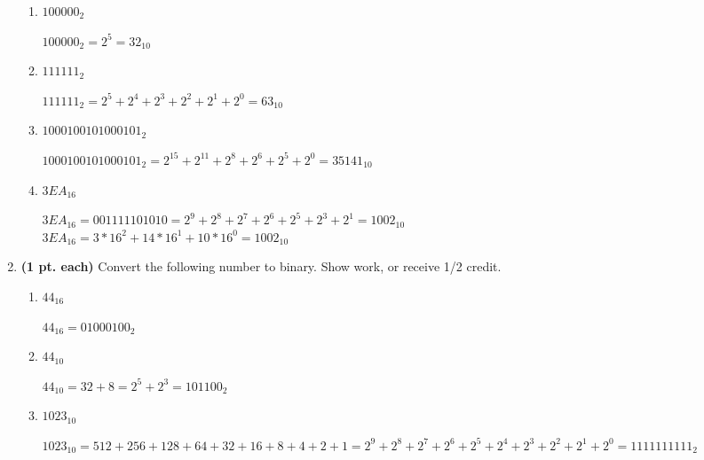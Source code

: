 \begin{enumerate}
\begin{enumerate}
            \item $100000_2$
                \begin{onlysolution}    \itshape $100000_2 = 2^5 = 32_{10}$
                \end{onlysolution}

            \item $111111_2$
                \begin{onlysolution}    \itshape $111111_2 = 2^5+2^4+2^3+2^2+2^1+2^0=63_{10}$
                \end{onlysolution}

            \item $1000100101000101_2$
                \begin{onlysolution}    \itshape $1000100101000101_2=2^{15}+2^{11}+2^8+2^6+2^5+2^0=35141_{10}$
                \end{onlysolution}

            \item $3EA_{16}$
                \begin{onlysolution}    \itshape$3EA_{16}=0011 1110 1010 =
                    2^9+2^8+2^7+2^6+2^5+2^3+2^1=1002_{10}$\\ {\color{blue} $3EA_{16} = 3*16^2 +14*16^1 + 10 *
                    16^0 = 1002_{10} $}
                \end{onlysolution}

        \end{enumerate}


    \item \textbf{ (1 pt. each)} Convert the following number to binary. Show
        work, or receive 1/2 credit.
        \begin{enumerate}
            \item $44_{16}$
                \begin{onlysolution}    \itshape $44_{16} =0100 0100_2$
                \end{onlysolution}

            \item $44_{10}$
                \begin{onlysolution}    \itshape $44_{10} = 32+8 = 2^5+2^3=101100_2$
                \end{onlysolution}

            \item $1023_{10}$
                \begin{onlysolution}    \itshape$1023_{10} = 512+256+128+64+32+16+8+4+2+1=
                    2^9+2^8+2^7+2^6+2^5+2^4+2^3+2^2+2^1+2^0=1111111111_2$
                \end{onlysolution}


\end{enumerate}
\end{enumerate}

